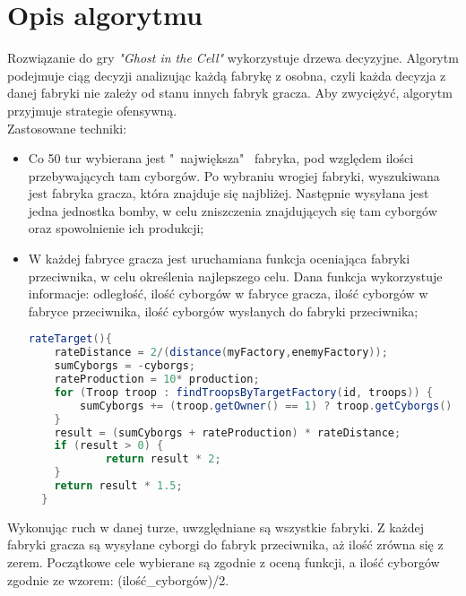 \documentclass[a4paper]{mwart}
\begin{document}
\section{Opis algorytmu}
Rozwiązanie do gry \emph{"Ghost in the Cell"} wykorzystuje drzewa decyzyjne. Algorytm podejmuje ciąg decyzji analizując każdą fabrykę z osobna, czyli każda decyzja z danej fabryki nie zależy od stanu innych fabryk gracza. Aby zwyciężyć, algorytm przyjmuje strategie ofensywną. \\ 
Zastosowane techniki:
\begin{itemize}
 \item Co 50 tur wybierana jest "~największa"~ fabryka, pod względem ilości przebywających tam cyborgów. Po wybraniu wrogiej fabryki, wyszukiwana jest fabryka gracza, która znajduje się najbliżej. Następnie wysyłana jest jedna jednostka bomby, w celu zniszczenia znajdujących się tam cyborgów oraz spowolnienie ich produkcji;
 \item W każdej fabryce gracza jest uruchamiana funkcja oceniająca fabryki przeciwnika, w celu określenia najlepszego celu. Dana funkcja wykorzystuje informacje: odległość, ilość cyborgów w fabryce gracza, ilość cyborgów w fabryce przeciwnika, ilość cyborgów wysłanych do fabryki przeciwnika;


\begin{scriptsize}
\begin{lstlisting}[language=Java]
 rateTarget(){
    rateDistance = 2/(distance(myFactory,enemyFactory));
    sumCyborgs = -cyborgs;
    rateProduction = 10* production;
    for (Troop troop : findTroopsByTargetFactory(id, troops)) {
    	sumCyborgs += (troop.getOwner() == 1) ? troop.getCyborgs() : -troop.getCyborgs();
    }
    result = (sumCyborgs + rateProduction) * rateDistance;    
    if (result > 0) {
            return result * 2;
    }
    return result * 1.5;
  }
\end{lstlisting}
\end{scriptsize}
\end{itemize}
Wykonując ruch w danej turze, uwzględniane są wszystkie fabryki. Z każdej fabryki gracza są wysyłane cyborgi do fabryk przeciwnika, aż ilość zrówna się z zerem. Początkowe cele wybierane są zgodnie z oceną funkcji, a ilość cyborgów zgodnie ze wzorem: (ilość\_cyborgów)/2.
\end{document}
